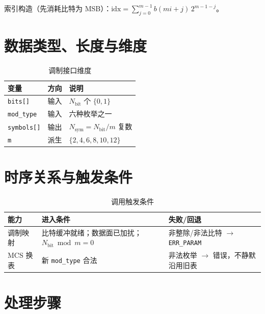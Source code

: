 \documentclass[11pt,a4paper]{ctexart}
\begin{document}
索引构造（先消耗比特为 MSB）：$\mathrm{idx}=\sum_{j=0}^{m-1} b(mi+j)\,2^{m-1-j}$。

\section{数据类型、长度与维度}

\begin{longtable}{L{3.5cm}L{2.5cm}L{8cm}}
\caption{调制接口维度\label{tab:656-dim}} \\
\toprule
\textbf{变量} & \textbf{方向} & \textbf{说明} \\
\midrule
\texttt{bits[]} & 输入 & $N_{\mathrm{bit}}$ 个 $\{0,1\}$ \\
\texttt{mod\_type} & 输入 & 六种枚举之一 \\
\texttt{symbols[]} & 输出 & $N_{\mathrm{sym}}=N_{\mathrm{bit}}/m$ 复数 \\
\texttt{m} & 派生 & $\{2,4,6,8,10,12\}$ \\
\bottomrule
\end{longtable}

\section{时序关系与触发条件}

\begin{longtable}{L{3.5cm}L{5.5cm}L{5.5cm}}
\caption{调用触发条件\label{tab:656-trig}} \\
\toprule
\textbf{能力} & \textbf{进入条件} & \textbf{失败/回退} \\
\midrule
调制映射 & 比特缓冲就绪；数据面已加扰；$N_{\mathrm{bit}}\bmod m{=}0$ & 非整除/非法比特 $\rightarrow$ \texttt{ERR\_PARAM} \\
MCS 换表 & 新 \texttt{mod\_type} 合法 & 非法枚举 $\rightarrow$ 错误，不静默沿用旧表 \\
\bottomrule
\end{longtable}

\section{处理步骤}
\end{document}
